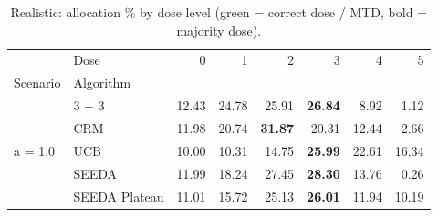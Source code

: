 \begin{table}[H]
\centering
\caption{Realistic: allocation \% by dose level (green = correct dose / MTD, bold = majority dose).}
\label{tab:real_alloc_by_dose}
\begin{tabular}{llrrrrrr}
\toprule
 & Dose & 0 & 1 & 2 & 3 & 4 & 5 \\
Scenario & Algorithm &  &  &  &  &  &  \\
\midrule
\multirow[c]{5}{*}{a = 1.0} & 3 + 3 & 12.43 & 24.78 & {\cellcolor[HTML]{C8E6C9}} 25.91 & \bfseries 26.84 & 8.92 & 1.12 \\
 & CRM & 11.98 & 20.74 & {\cellcolor[HTML]{C8E6C9}} \bfseries 31.87 & 20.31 & 12.44 & 2.66 \\
 & UCB & 10.00 & 10.31 & {\cellcolor[HTML]{C8E6C9}} 14.75 & \bfseries 25.99 & 22.61 & 16.34 \\
 & SEEDA & 11.99 & 18.24 & {\cellcolor[HTML]{C8E6C9}} 27.45 & \bfseries 28.30 & 13.76 & 0.26 \\
 & SEEDA Plateau & 11.01 & 15.72 & {\cellcolor[HTML]{C8E6C9}} 25.13 & \bfseries 26.01 & 11.94 & 10.19 \\
\bottomrule
\end{tabular}
\end{table}
